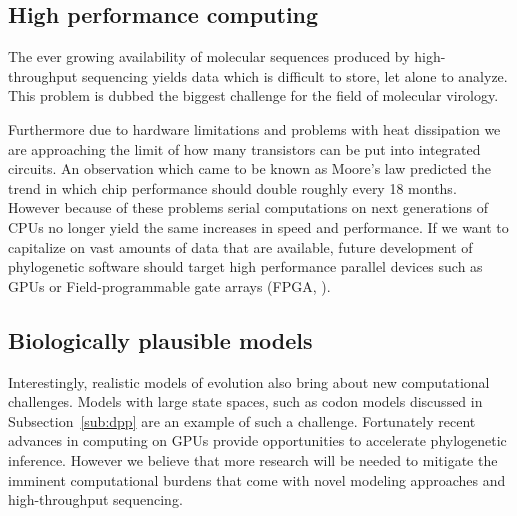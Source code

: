 \subsection{High performance computing}

The ever growing availability of molecular sequences produced by high-throughput sequencing yields data which is difficult to store, let alone to analyze.
This problem is dubbed the biggest challenge for the field of molecular virology. %

Furthermore due to hardware limitations and problems with heat dissipation we are approaching the limit of how many transistors can be put into integrated circuits.
An observation which came to be known as Moore's law predicted the trend in which chip performance should double roughly every 18 months.
However because of these problems serial computations on next generations of CPUs no longer yield the same increases in speed and performance.
If we want to capitalize on vast amounts of data that are available, future development of phylogenetic software should target high performance parallel devices such as GPUs \citep{Nickolls2008} or Field-programmable gate arrays (FPGA, \citet{Kuon2008}).

\subsection{Biologically plausible models}

Interestingly, realistic models of evolution also bring about new computational challenges.
Models with large state spaces, such as codon models discussed in Subsection~\ref{sub:dpp} are an example of such a challenge.
Fortunately recent advances in computing on GPUs \citep{Ayres2012} provide opportunities to accelerate phylogenetic inference.
However we believe that more research will be needed to mitigate the imminent computational burdens that come with novel modeling approaches and high-throughput sequencing. 


